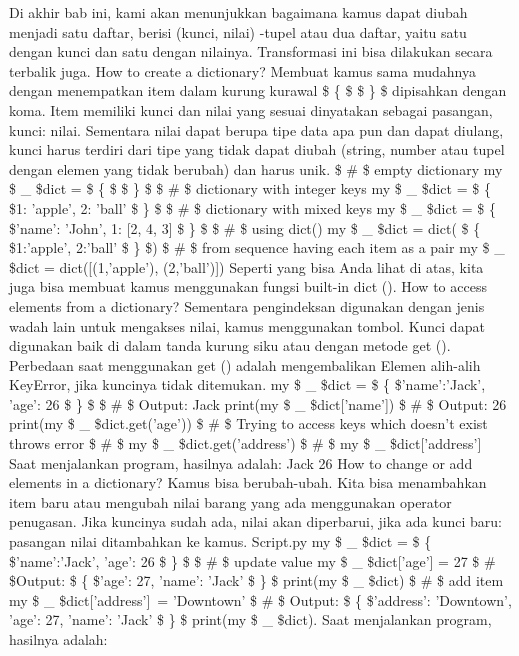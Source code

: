 Di akhir bab ini, kami akan menunjukkan bagaimana kamus dapat diubah menjadi satu daftar, berisi (kunci, nilai) -tupel atau dua daftar, yaitu satu dengan kunci dan satu dengan nilainya. Transformasi ini bisa dilakukan secara terbalik juga. 
How to create a dictionary? 
Membuat kamus sama mudahnya dengan menempatkan item dalam kurung kurawal  \$  \{  \$ \$  \}  \$ dipisahkan dengan koma. Item memiliki kunci dan nilai yang sesuai dinyatakan sebagai pasangan, kunci: nilai. Sementara nilai dapat berupa tipe data apa pun dan dapat diulang, kunci harus terdiri dari tipe yang tidak dapat diubah (string, number atau tupel dengan elemen yang tidak berubah) dan harus unik. 
   \$  \#  \$ empty dictionary 
  my \$  \_  \$dict =  \$  \{  \$ \$  \}  \$ 
   \$  \#  \$ dictionary with integer keys 
  my \$  \_  \$dict =  \$  \{  \$1: 'apple', 2: 'ball' \$  \}  \$ 
   \$  \#  \$ dictionary with mixed keys 
  my \$  \_  \$dict =  \$  \{  \$'name': 'John', 1: [2, 4, 3] \$  \}  \$ 
   \$  \#  \$ using dict() 
  my \$  \_  \$dict = dict( \$  \{  \$1:'apple', 2:'ball' \$  \}  \$) 
   \$  \#  \$ from sequence having each item as a pair 
  my \$  \_  \$dict = dict([(1,'apple'), (2,'ball')]) 
Seperti yang bisa Anda lihat di atas, kita juga bisa membuat kamus menggunakan fungsi built-in dict (). 
How to access elements from a dictionary? 
Sementara pengindeksan digunakan dengan jenis wadah lain untuk mengakses nilai, kamus menggunakan tombol. Kunci dapat digunakan baik di dalam tanda kurung siku atau dengan metode get (). Perbedaan saat menggunakan get () adalah mengembalikan Elemen alih-alih KeyError, jika kuncinya tidak ditemukan. 
  my \$  \_  \$dict =  \$  \{  \$'name':'Jack', 'age': 26 \$  \}  \$ 
   \$  \#  \$ Output: Jack 
  print(my \$  \_  \$dict['name']) 
   \$  \#  \$ Output: 26 
  print(my \$  \_  \$dict.get('age')) 
   \$  \#  \$ Trying to access keys which doesn't exist throws error 
   \$  \#  \$ my \$  \_  \$dict.get('address') 
   \$  \#  \$ my \$  \_  \$dict['address'] 
Saat menjalankan program, hasilnya adalah: 
Jack 
26 
How to change or add elements in a dictionary? 
Kamus bisa berubah-ubah. Kita bisa menambahkan item baru atau mengubah nilai barang yang ada menggunakan operator penugasan. 
Jika kuncinya sudah ada, nilai akan diperbarui, jika ada kunci baru: pasangan nilai ditambahkan ke kamus. 
Script.py 
  my \$  \_  \$dict =  \$  \{  \$'name':'Jack', 'age': 26 \$  \}  \$ 
   \$  \#  \$ update value 
  my \$  \_  \$dict['age'] = 27 
   \$  \#  \$Output:  \$  \{  \$'age': 27, 'name': 'Jack' \$  \}  \$ 
  print(my \$  \_  \$dict) 
   \$  \#  \$ add item 
  my \$  \_  \$dict['address']~= 'Downtown'   
   \$  \#  \$ Output:  \$  \{  \$'address': 'Downtown', 'age': 27, 'name': 'Jack' \$  \}  \$ 
  print(my \$  \_  \$dict). 
Saat menjalankan program, hasilnya adalah: 


